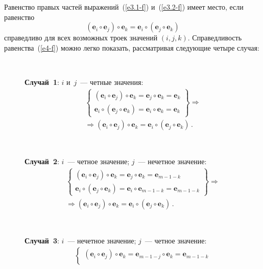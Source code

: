 \begin{multicols}{2}
  Равенство правых частей выражений~(\ref{e3.1-f}) и~(\ref{e3.2-f}) имеет 
место, если равенство
  \begin{equation}
  \left(\mathbf{e}_i\circ\mathbf{e}_j\right)\circ\mathbf{e}_k=\mathbf{e}_i\circ\left
( \mathbf{e}_j\circ\mathbf{e}_k\right)
  \label{e4-f}
  \end{equation}
справедливо для всех возможных троек значений $(i, j, k)$. Справедливость 
равенства~(\ref{e4-f}) можно легко показать, рассматривая следующие четыре 
случая:
\begin{description}
\item[\,]  \textbf{Случай~1}: $i$ и~$j$~--- четные значения: 
  \begin{multline*}
  \left\{ \begin{matrix}
  \left( \mathbf{e}_i\circ \mathbf{e}_j\right) \circ\mathbf{e}_k = \mathbf{e}_j 
\circ \mathbf{e}_k =\mathbf{e}_k\\
  \mathbf{e}_i \circ \left(\mathbf{e}_j\circ \mathbf{e}_k\right) 
=\mathbf{e}_i\circ \mathbf{e}_k =\mathbf{e}_k
  \end{matrix}
  \right\} \Rightarrow {}\\
  {}\Rightarrow \left(\mathbf{e}_i\circ \mathbf{e}_j\right)\circ 
\mathbf{e}_k=\mathbf{e}_i\circ\left(\mathbf{e}_j\circ \mathbf{e}_k\right)\,.
\end{multline*}
\item[\,]  
  \textbf{Случай~2}: $i$~--- четное значение; $j$~--- нечетное значение: 
\begin{multline*}
  \left\{
  \begin{matrix}
  \left(\mathbf{e}_i\circ \mathbf{e}_j\right)  \circ\mathbf{e}_k 
=\mathbf{e}_j\circ\mathbf{e}_k =\mathbf{e}_{m-1-k}\\
  \mathbf{e}_i \circ\left(\mathbf{e}_j\circ \mathbf{e}_k\right) = 
\mathbf{e}_i\circ \mathbf{e}_{m-1-k} =\mathbf{e}_{m-1-k}
  \end{matrix}
  \right\} \Rightarrow{}\\
  {}\Rightarrow \left(\mathbf{e}_i\circ \mathbf{e}_j\right)\circ 
\mathbf{e}_k=\mathbf{e}_i\circ\left(\mathbf{e}_j\circ \mathbf{e}_k\right)\,.
\end{multline*}
  \item[\,]
  \textbf{Случай~3}: $i$~--- нечетное значение; $j$~--- четное значение: 
  \begin{multline*}
  \left\{ \begin{matrix}
  \left(\mathbf{e}_i\circ \mathbf{e}_j\right)\circ \mathbf{e}_k=\mathbf{e}_{m-
1-j}\circ \mathbf{e}_k =\mathbf{e}_{m-1-k}\\

\end{matrix}
\end{multline*}
\end{description}
\end{multicols}
